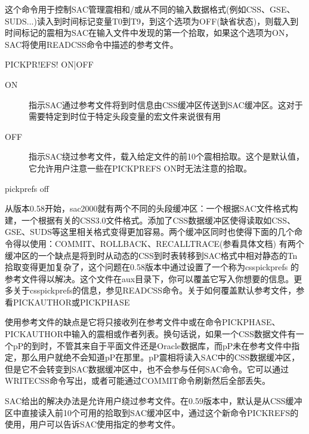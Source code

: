 \label{cmd:pickprefs}

这个命令用于控制SAC管理震相和/或从不同的输入数据格式(例如CSS、GSE、SUDS...)读入到时间标记变量T0到T9，到这个选项为OFF(缺省状态)，则载入到时间标记的震相为SAC在输入文件中发现的第一个拾取，如果这个选项为ON，SAC将使用READCSS命令中描述的参考文件。

\begin{SACSTX}
PICKPR!EFS! ON|OFF
\end{SACSTX}

\begin{description}
\item [ON] 指示SAC通过参考文件将到时信息由CSS缓冲区传送到SAC缓冲区。这对于需要特定到时位于特定头段变量的宏文件来说很有用
\item [OFF] 指示SAC绕过参考文件，载入给定文件的前10个震相拾取。这个是默认值，它允许用户注意一些在PICKPREFS ON时无法注意的拾取。
\end{description}

\begin{SACDFT}
pickprefs off
\end{SACDFT}

从版本0.58开始，sac2000就有两个不同的头段缓冲区：一个根据SAC文件格式构建，一个根据有关的CSS3.0文件格式。添加了CSS数据缓冲区使得读取如CSS、GSE、SUDS等这里相关格式变得更加容易。两个缓冲区同时也使得下面的几个命令得以使用：COMMIT、ROLLBACK、RECALLTRACE(参看具体文档)
有两个缓冲区的一个缺点是将到时从动态的CSS到时表转移到SAC格式中相对静态的Tn拾取变得更加复杂了，这个问题在0.58版本中通过设置了一个称为csspickprefs	的参考文件得以解决。这个文件在aux目录下，你可以覆盖它写入你想要的信息。更	多关于csspickprefs的信息，参见READCSS命令。关于如何覆盖默认参考文件，参看PICKAUTHOR或PICKPHASE

使用参考文件的缺点是它将只接收列在参考文件中或在命令PICKPHASE、PICKAUTHOR中输入的震相或作者列表。换句话说，如果一个CSS数据文件有一个pP的到时，不管其来自于平面文件还是Oracle数据库，而pP未在参考文件中指定，那么用户就绝不会知道pP在那里。pP震相将读入SAC中的CSS数据缓冲区，但是它不会转变到SAC数据缓冲区中，也不会参与任何SAC命令。它可以通过WRITECSS命令写出，或者可能通过COMMIT命令刷新然后全部丢失。

SAC给出的解决办法是允许用户绕过参考文件。在0.59版本中，默认是从CSS缓冲区中直接读入前10个可用的拾取到SAC缓冲区中，通过这个新命令PICKREFS的使用，用户可以告诉SAC使用指定的参考文件。
